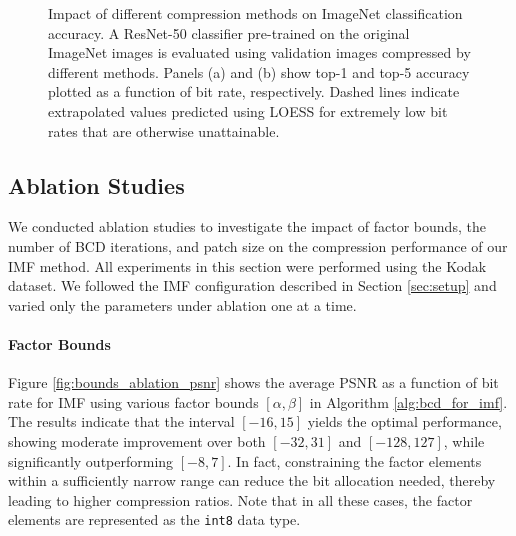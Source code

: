 \begin{figure*}[!t]
    \centering
    \begin{subfigure}[t]{.5\textwidth}
        \centering
        \resizebox{.9\textwidth}{!}{}
        \caption{}
        \label{fig:imagenet_top1}
    \end{subfigure}%
    \begin{subfigure}[t]{.5\textwidth}
        \centering
        \resizebox{.9\textwidth}{!}{}
        \caption{}
        \label{fig:imagenet_top5}
    \end{subfigure}
    \caption{Impact of different compression methods on ImageNet classification accuracy. A ResNet-50 classifier pre-trained on the original ImageNet images is evaluated using validation images compressed by different methods. Panels (a) and (b) show top-1 and top-5 accuracy plotted as a function of bit rate, respectively. Dashed lines indicate extrapolated values predicted using LOESS \cite{cleveland1988locally} for extremely low bit rates that are otherwise unattainable.}
    \label{fig:imagenet_classification}
\end{figure*}


\subsection{Ablation Studies} \label{sec:ablation_studies}

We conducted ablation studies to investigate the impact of factor bounds, the number of BCD iterations, and patch size on the compression performance of our IMF method. All experiments in this section were performed using the Kodak dataset. We followed the IMF configuration described in Section \ref{sec:setup} and varied only the parameters under ablation one at a time.

\paragraph{Factor Bounds}
Figure \ref{fig:bounds_ablation_psnr} shows the average PSNR as a function of bit rate for IMF using various factor bounds $[\alpha, \beta]$ in Algorithm \ref{alg:bcd_for_imf}. The results indicate that the interval $[-16, 15]$ yields the optimal performance, showing moderate improvement over both $[-32, 31]$ and $[-128, 127]$, while significantly outperforming $[-8, 7]$. In fact, constraining the factor elements within a sufficiently narrow range can reduce the bit allocation needed, thereby leading to higher compression ratios. Note that in all these cases, the factor elements are represented as the \texttt{int8} data type.

